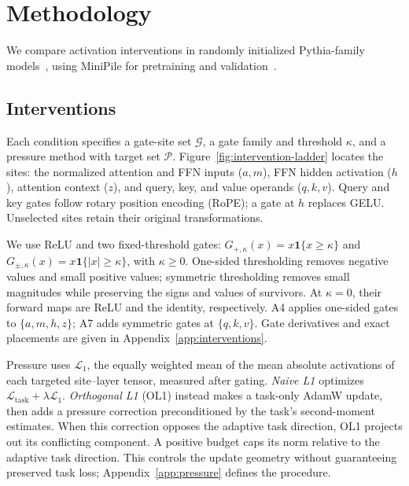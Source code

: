 \section{Methodology}
\label{sec:methodology}

We compare activation interventions in randomly initialized Pythia-family
models~\citep{biderman2023pythia}, using MiniPile for pretraining and
validation~\citep{kaddour2023minipile}.

\subsection{Interventions}
\label{sec:interventions}

Each condition specifies a gate-site set $\mathcal{G}$, a gate family and
threshold $\kappa$, and a pressure method with target set $\mathcal{P}$.
Figure~\ref{fig:intervention-ladder} locates the sites: the normalized attention
and FFN inputs ($a,m$), FFN hidden activation ($h$), attention context ($z$),
and query, key, and value operands ($q,k,v$). Query and key gates follow rotary
position encoding (RoPE); a gate at $h$ replaces GELU. Unselected sites retain
their original transformations.

We use ReLU and two fixed-threshold gates:
$G_{+,\kappa}(x)=x\mathbf{1}\{x\geq\kappa\}$ and
$G_{\pm,\kappa}(x)=x\mathbf{1}\{|x|\geq\kappa\}$, with $\kappa\geq0$.
One-sided thresholding removes negative values and small positive values;
symmetric thresholding removes small magnitudes while preserving the signs
and values of survivors. At $\kappa=0$, their forward maps are ReLU and the
identity, respectively. A4 applies one-sided gates to $\{a,m,h,z\}$; A7 adds symmetric
gates at $\{q,k,v\}$. Gate derivatives and exact placements are given in
Appendix~\ref{app:interventions}.

Pressure uses $\mathcal{L}_1$, the equally weighted mean of the mean absolute
activations of each targeted site--layer tensor, measured after gating.
\emph{Naive L1} optimizes $\mathcal{L}_{\mathrm{task}}+\lambda\mathcal{L}_1$.
\emph{Orthogonal L1} (OL1) instead makes a task-only AdamW update, then adds
a pressure correction preconditioned by the task's second-moment estimates.
When this correction opposes the adaptive task direction, OL1 projects out
its conflicting component. A positive budget caps its norm relative to the adaptive task direction.
This controls the update geometry without guaranteeing preserved task loss;
Appendix~\ref{app:pressure} defines the procedure.

